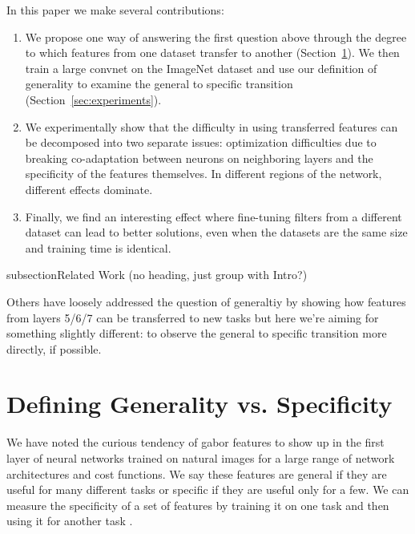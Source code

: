 In this paper we make several contributions:

\begin{enumerate}
\item We propose one way of answering the first question above through the degree to which features from one dataset transfer to another (Section~\ref{sec:definition}). We then train a large convnet on the ImageNet dataset and use our definition of generality to examine the general to specific transition (Section~\ref{sec:experiments}).
\item We experimentally show that the difficulty in using transferred features can be decomposed into two separate issues: optimization difficulties due to breaking co-adaptation between neurons on neighboring layers and the specificity of the features themselves. In different regions of the network, different effects dominate.
\item Finally, we find an interesting effect where fine-tuning filters from a different dataset can lead to better solutions, even when the datasets are the same size and training time is identical.
\end{enumerate}





subsection{Related Work (no heading, just group with Intro?)}

Others have loosely addressed the question of generaltiy by showing how features from layers 5/6/7 can be transferred to new tasks \cite{donahue+jia-2013-arxiv} but here we're aiming for something slightly different: to observe the general to specific transition more directly, if possible.






\section{Defining Generality vs. Specificity}
\label{sec:definition}

We have noted the curious tendency of gabor features to show up in the first layer of neural networks trained on natural images for a large range of network architectures and cost functions. We say these features are general if they are useful for many different tasks or specific if they are useful only for a few. We can measure the specificity of a set of features by training it on one task \dA and then using it for another task \dB.

